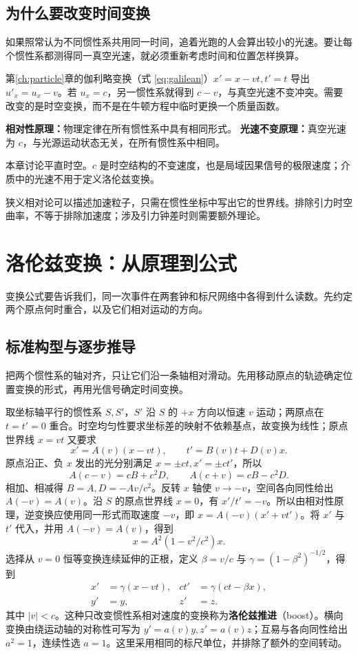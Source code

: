 \subsection{为什么要改变时间变换}
如果照常认为不同惯性系共用同一时间，追着光跑的人会算出较小的光速。要让每个惯性系都测得同一真空光速，就必须重新考虑时间和位置怎样换算。

第\ref{ch:particle}章的伽利略变换（式 \eqref{eq:galilean}）$x'=x-vt,t'=t$ 导出 $u'_x=u_x-v$。若 $u_x=c$，另一惯性系就得到 $c-v$，与真空光速不变冲突。需要改变的是时空变换，而不是在牛顿方程中临时更换一个质量函数。
\begin{keybox}
\textbf{相对性原理：}物理定律在所有惯性系中具有相同形式。\quad
\textbf{光速不变原理：}真空光速为 $c$，与光源运动状态无关，在所有惯性系中相同。

本章讨论平直时空。$c$ 是时空结构的不变速度，也是局域因果信号的极限速度；介质中的光速不用于定义洛伦兹变换。
\end{keybox}
狭义相对论可以描述加速粒子，只需在惯性坐标中写出它的世界线。排除引力时空曲率，不等于排除加速度；涉及引力钟差时则需要额外理论。

\section{洛伦兹变换：从原理到公式}
变换公式要告诉我们，同一次事件在两套钟和标尺网络中各得到什么读数。先约定两个原点何时重合，以及它们相对运动的方向。

\subsection{标准构型与逐步推导}
把两个惯性系的轴对齐，只让它们沿一条轴相对滑动。先用移动原点的轨迹确定位置变换的形式，再用光信号确定时间变换。

取坐标轴平行的惯性系 $S,S'$，$S'$ 沿 $S$ 的 $+x$ 方向以恒速 $v$ 运动；两原点在 $t=t'=0$ 重合。时空均匀性要求坐标差的映射不依赖基点，故变换为线性；原点世界线 $x=vt$ 又要求
\[
x'=A(v)(x-vt),\qquad t'=B(v)t+D(v)x.
\]
原点沿正、负 $x$ 发出的光分别满足 $x=\pm ct,x'=\pm ct'$，所以
\[
A(c-v)=cB+c^2D,\qquad A(c+v)=cB-c^2D.
\]
相加、相减得 $B=A,D=-Av/c^2$。反转 $x$ 轴使 $v\to-v$，空间各向同性给出 $A(-v)=A(v)$。沿 $S$ 的原点世界线 $x=0$，有 $x'/t'=-v$。所以由相对性原理，逆变换应使用同一形式而取速度 $-v$，即 $x=A(-v)(x'+vt')$。将 $x'$ 与 $t'$ 代入，并用 $A(-v)=A(v)$，得到
\[
x=A^2(1-v^2/c^2)x.
\]
选择从 $v=0$ 恒等变换连续延伸的正根，定义 $\beta=v/c$ 与 $\gamma=(1-\beta^2)^{-1/2}$，得到
\begin{equation}\label{eq:sr-lorentz}
\boxed{\begin{aligned}
x'&=\gamma(x-vt),& ct'&=\gamma(ct-\beta x),\\
y'&=y,&z'&=z.
\end{aligned}}
\end{equation}
其中 $|v|<c$。这种只改变惯性系相对速度的变换称为\textbf{洛伦兹推进}（boost）。横向变换由绕运动轴的对称性可写为 $y'=a(v)y,z'=a(v)z$；互易与各向同性给出 $a^2=1$，连续性选 $a=1$。这里采用相同的标尺单位，并排除了额外的空间转动。

